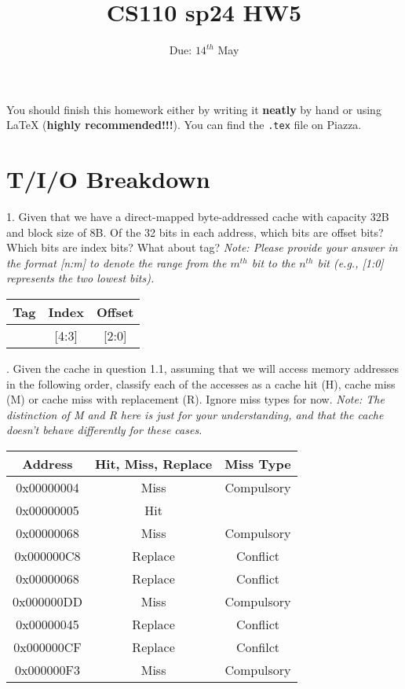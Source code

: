 \documentclass{article}
\title{CS110 sp24 HW5}
\date{Due: $14^{th}$ May}
\begin{document}
\maketitle

You should finish this homework either by writing it \textbf{neatly} by hand or using LaTeX (\textbf{highly recommended!!!}). You can find the \texttt{.tex} file on Piazza.
\section{T/I/O Breakdown}
1. Given that we have a direct-mapped byte-addressed cache with capacity 32B and block size of 8B. Of the 32 bits in each address, which bits are offset bits? Which bits are index bits? What about tag? \textit{Note: Please provide your answer in the format [n:m] to denote the range from the $m^{th}$ bit to the $n^{th}$ bit (e.g., [1:0] represents the two lowest bits).}
\begin{table}[H]
    \centering
    \ttfamily
    \Large
    \setlength{\tabcolsep}{12pt}
    \begin{tabular}{|c|c|c|}
        \hline
        Tag    & Index & Offset \\
        \hline
        [31:5] & [4:3] & [2:0]  \\ \hline
    \end{tabular}
\end{table}

. Given the cache in question 1.1, assuming that we will access memory addresses in the following order, classify each of the accesses as a cache hit (H), cache miss (M) or cache miss with replacement (R). Ignore miss types for now.
\textit{Note: The distinction of M and R here is just for your understanding, and that the cache doesn't behave differently for these cases.}
\begin{table}[H]
    \centering
    \ttfamily
    \begin{tabular}{|c|c|c|}
        \hline
        Address    & Hit, Miss, Replace & Miss Type  \\ \hline
        0x00000004 & Miss               & Compulsory \\ \hline
        0x00000005 & Hit                &            \\ \hline
        0x00000068 & Miss               & Compulsory \\ \hline
        0x000000C8 & Replace            & Conflict   \\ \hline
        0x00000068 & Replace            & Conflict   \\ \hline
        0x000000DD & Miss               & Compulsory \\ \hline
        0x00000045 & Replace            & Conflict   \\ \hline
        0x000000CF & Replace            & Confilct   \\ \hline
        0x000000F3 & Miss               & Compulsory \\ \hline
    \end{tabular}
\end{table}
\end{document}
